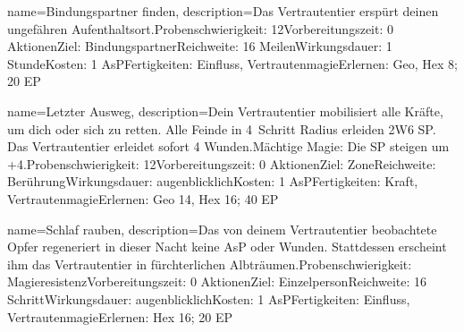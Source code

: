 {
    name={Bindungspartner finden},
    description={Das Vertrautentier erspürt deinen ungefähren Aufenthaltsort.\newline Probenschwierigkeit: 12\newline Vorbereitungszeit: 0 Aktionen\newline Ziel: Bindungspartner\newline Reichweite: 16 Meilen\newline Wirkungsdauer: 1 Stunde\newline Kosten: 1 AsP\newline Fertigkeiten: Einfluss, Vertrautenmagie\newline Erlernen: Geo, Hex 8; 20 EP}
}


{
    name={Letzter Ausweg},
    description={Dein Vertrautentier mobilisiert alle Kräfte, um dich oder sich zu retten. Alle Feinde in 4 Schritt Radius erleiden 2W6 SP. Das Vertrautentier erleidet sofort 4 Wunden.\newline Mächtige Magie: Die SP steigen um +4.\newline Probenschwierigkeit: 12\newline Vorbereitungszeit: 0 Aktionen\newline Ziel: Zone\newline Reichweite: Berührung\newline Wirkungsdauer: augenblicklich\newline Kosten: 1 AsP\newline Fertigkeiten: Kraft, Vertrautenmagie\newline Erlernen: Geo 14, Hex 16; 40 EP}
}


{
    name={Schlaf rauben},
    description={Das von deinem Vertrautentier beobachtete Opfer regeneriert in dieser Nacht keine AsP oder Wunden. Stattdessen erscheint ihm das Vertrautentier in fürchterlichen Albträumen.\newline Probenschwierigkeit: Magieresistenz\newline Vorbereitungszeit: 0 Aktionen\newline Ziel: Einzelperson\newline Reichweite: 16 Schritt\newline Wirkungsdauer: augenblicklich\newline Kosten: 1 AsP\newline Fertigkeiten: Einfluss, Vertrautenmagie\newline Erlernen: Hex 16; 20 EP}
}


